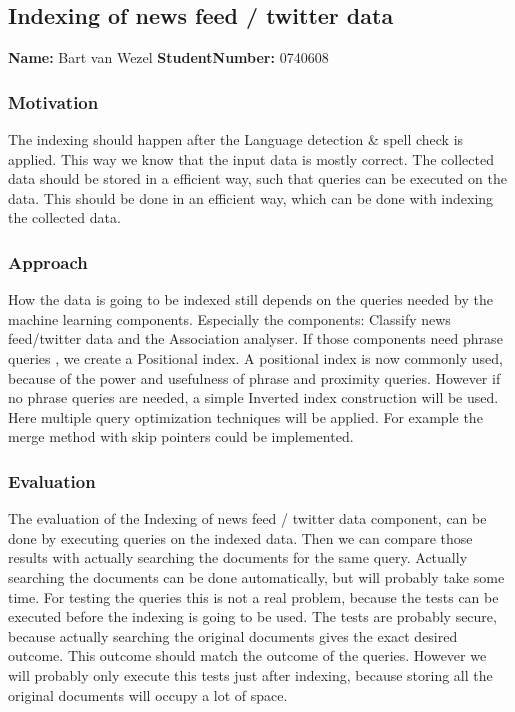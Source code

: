 \subsection*{Indexing of news feed / twitter data   }
\textbf{Name:} Bart van Wezel  \textbf{StudentNumber:} 0740608

\subsubsection*{Motivation}
The indexing should happen after the Language detection \& spell check is applied. This way we know that the input data is mostly correct.  The collected data should be stored in a efficient way, such that queries can be executed on the data. This should be done in an efficient way, which can be done with indexing the collected data. 

\subsubsection*{Approach}
How the data is going to be indexed still depends on the queries needed by the machine learning components. Especially the components: Classify news feed/twitter data and the Association analyser. If those components need phrase queries , we create a Positional index.  A positional index is now commonly used, because of the power and usefulness of phrase and proximity queries. However if no phrase queries are needed, a simple Inverted index construction will be used. Here multiple query optimization techniques will be applied. For example the merge method with skip pointers could be implemented. 

\subsubsection*{Evaluation }
The evaluation of the Indexing of news feed / twitter data component, can be done by executing queries on the indexed data. Then we can compare those results with actually searching the documents for the same query. Actually searching the documents can be done automatically, but will probably take some time. For testing the queries this is not a real problem, because the tests can be executed before the indexing is going to be used. The tests are probably secure, because actually searching the original documents gives the exact desired outcome. This outcome should match the outcome of the queries. However we will probably only execute this tests just after indexing, because storing all the original documents will occupy a lot of space. 
